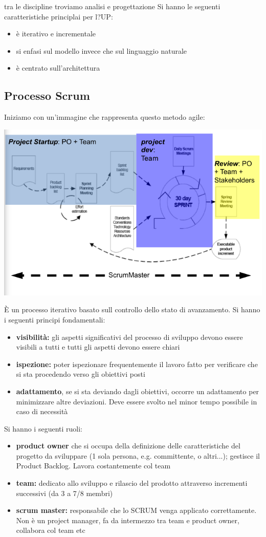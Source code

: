 \documentclass[a4paper,12pt, oneside]{book}
\begin{document}
tra le discipline troviamo analisi e progettazione
Si hanno le seguenti caratteristiche principlai per l?UP:
\begin{itemize}
	\item è iterativo e incrementale
	\item si enfasi sul modello invece che sul linguaggio naturale
	\item è centrato sull'architettura
\end{itemize}
\subsection{Processo Scrum}
Iniziamo con un'immagine che rappresenta questo metodo agile:
\begin{center}
	\includegraphics[scale=0.65]{img/ms10.png}
\end{center}
È un processo iterativo basato sull controllo dello stato di
avanzamento. Si hanno i seguenti principi fondamentali:
\begin{itemize}
	\item \textbf{visibilità:} gli aspetti significativi del processo di sviluppo devono essere visibili a tutti e tutti gli aspetti devono essere chiari
	\item \textbf{ispezione:} poter ispezionare frequentemente il lavoro fatto per verificare che si sta procedendo verso gli
	      obiettivi posti
	\item \textbf{adattamento}, se si sta deviando dagli obiettivi, occorre un adattamento per minimizzare altre deviazioni. Deve essere svolto nel minor tempo possibile in caso di necessità
\end{itemize}
Si hanno i seguenti ruoli:
\begin{itemize}
	\item \textbf{product owner} che si occupa della definizione delle
	      caratteristiche del progetto da sviluppare (1 sola
	      persona, e.g. committente, o altri...); gestisce il
	      Product Backlog. Lavora costantemente col team
	\item \textbf{team:} dedicato allo sviluppo e rilascio del
	      prodotto attraverso incrementi successivi (da 3 a
	      7/8 membri)
	\item \textbf{scrum master:} responsabile che lo SCRUM venga
	      applicato correttamente. Non è un project manager, fa da intermezzo tra team e product owner, collabora col team etc
\end{itemize}
\end{document}
